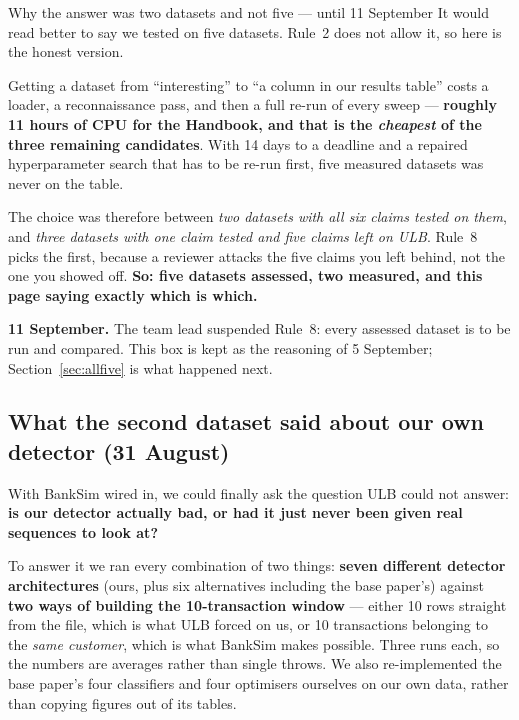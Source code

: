 \documentclass[11pt]{article}
\begin{document}
\begin{keybox}{Why the answer was two datasets and not five --- until 11 September}
It would read better to say we tested on five datasets. Rule~2 does not allow it, so here is the honest
version.

Getting a dataset from ``interesting'' to ``a column in our results table'' costs a loader, a
reconnaissance pass, and then a full re-run of every sweep --- \textbf{roughly 11 hours of CPU for the
Handbook, and that is the \emph{cheapest} of the three remaining candidates}. With 14 days to a deadline
and a repaired hyperparameter search that has to be re-run first, five measured datasets was never on
the table.

The choice was therefore between \emph{two datasets with all six claims tested on them}, and
\emph{three datasets with one claim tested and five claims left on ULB}. Rule~8 picks the first, because
a reviewer attacks the five claims you left behind, not the one you showed off. \textbf{So: five
datasets assessed, two measured, and this page saying exactly which is which.}

\textbf{11 September.} The team lead suspended Rule~8: every assessed dataset is to be run and compared.
This box is kept as the reasoning of 5 September; Section~\ref{sec:allfive} is what happened next.
\end{keybox}

\subsection{What the second dataset said about our own detector (31 August)}

With BankSim wired in, we could finally ask the question ULB could not answer: \textbf{is our detector
actually bad, or had it just never been given real sequences to look at?}

To answer it we ran every combination of two things: \textbf{seven different detector architectures}
(ours, plus six alternatives including the base paper's) against \textbf{two ways of building the
10-transaction window} --- either 10 rows straight from the file, which is what ULB forced on us, or 10
transactions belonging to the \emph{same customer}, which is what BankSim makes possible. Three runs
each, so the numbers are averages rather than single throws. We also re-implemented the base paper's
four classifiers and four optimisers ourselves on our own data, rather than copying figures out of its
tables.
\end{document}
